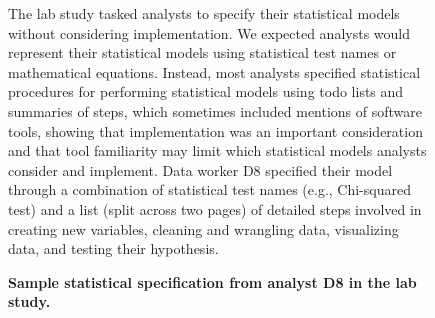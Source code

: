{\begin{figure}[tb]
\begin{minipage}{0.45\textwidth}
        \end{minipage}
        \caption{\textbf{Sample statistical specification from analyst D8 in the lab study.}\label{figure:labStudyStatSpec}}
            \begin{small}
            \begin{minipage}{\linewidth}
            The lab study tasked analysts
            to specify their statistical models without
            considering implementation. 
            We expected analysts would represent
            their statistical models using statistical test names or mathematical equations. 
            Instead, most analysts specified statistical procedures for performing statistical models 
            using todo lists and summaries of steps,
            which sometimes included mentions of software tools, showing that
            implementation was an important consideration and
            that tool familiarity may limit which statistical models
            analysts consider and implement.
            Data worker D8 specified their model through a combination of statistical test names (e.g., Chi-squared test) and a list (split across two pages) of detailed steps
            involved in creating new variables, cleaning and wrangling data,
            visualizing data, and testing their hypothesis. 
            \end{minipage}
            \end{small}
    \end{figure}
}

